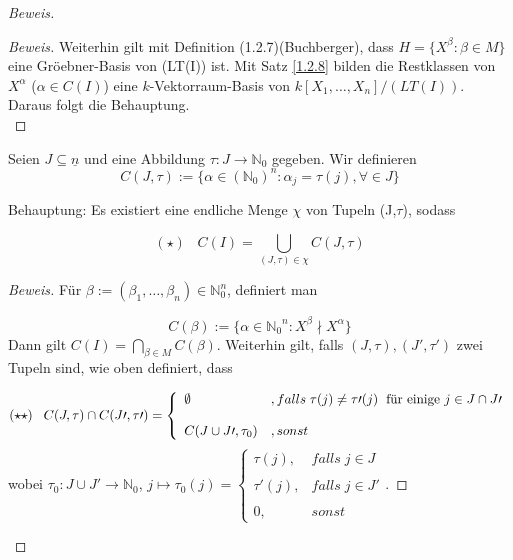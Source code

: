 \documentclass{article}
\newcommand*{\R}{k[X_{1},\ldots,X_{n}]}
\newcommand*{\indx}[2]{{#1}_{#2}}
\newcommand*{\potx}[2]{{#1}^{#2}}
\newcommand*{\N}{\mathbb{N}_0}
\begin{document}
\begin{proof}[Beweis]
\begin{compactenum}
\begin{proof}[Beweis]
			Weiterhin gilt mit Definition (1.2.7)(Buchberger), dass $H=\{\potx{X}{\beta}:\beta \in M \}$ eine Gröebner-Basis von (LT(I)) ist. Mit Satz \ref{1.2.8} bilden die Restklassen von $\potx{X}{\alpha}$ ($\alpha\in C(I)$) eine $k$-Vektorraum-Basis von $\R/(LT(I))$. Daraus folgt die Behauptung.\\
		\end{proof}
		\item Seien $J\subseteq \underline{n}$ und eine Abbildung $\tau:J\longrightarrow \N$ gegeben. Wir definieren
		\begin{displaymath}
		C(J,\tau):=\{\alpha \in (\N)^n: \indx{\alpha}{j}=\tau(j), \forall \in J  \}
		\end{displaymath}
		
		Behauptung: Es existiert eine endliche Menge $\chi$ von Tupeln (J,$\tau$), sodass 
		
		\begin{displaymath}
		(\star)\;\;\;   C(I)=\bigcup\limits_{(J,\tau)\in \chi} C(J,\tau)  
		\end{displaymath}
		
		\begin{proof}[Beweis]
			Für $\beta:=(\indx{\beta}{1},\ldots,\indx{\beta}{n}) \in \N^n$, definiert man 
			
			\begin{displaymath}
			C(\beta):=\{\alpha\in \potx{\N}{n}: \potx{X}{\beta}\nmid\potx{X}{\alpha}\}
			\end{displaymath}
			Dann gilt $C(I)=\bigcap\limits_{\beta\in M}C(\beta)$. 
			Weiterhin gilt, falls $(J,\tau),(J\prime,\tau\prime)$ zwei Tupeln sind, wie oben definiert, dass
			
			\begin{displaymath}
			(\star \star)\;\;\;   C(J,\tau)\cap C(J\prime,\tau\prime)=\left\{\begin{array}{ll} \emptyset & ,falls  \;\tau(j)\neq\tau\prime(j)\; \textnormal{ für einige } j\in J\cap J\prime \\
			\\
			C(J\cup J\prime, \tau_0) & ,sonst \end{array}\right.
			\end{displaymath} 
			wobei $\indx{\tau}{0}:J\cup J\prime \longrightarrow \N$, $ j\mapsto \tau_{0}(j)=\left\{\begin{array}{ll} \tau(j), & falls\;  j \in J \\
			\\
			\tau\prime(j), & falls\;  j \in J\prime \\
			\\
			0, & sonst \end{array}\right.$.
			

\end{proof}
\end{compactenum}
\end{proof}
\end{document}
